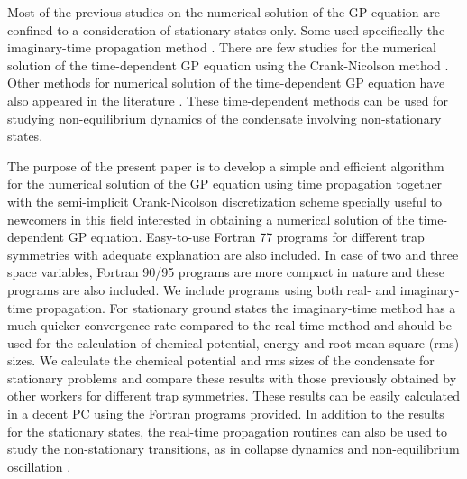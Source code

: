 \documentclass[onecolumn]{elsart3p}
\begin{document}
Most of the previous studies
\cite{Tiwari_Shukla,Bao_Tang,Schneider_Feder,chang,num1,num4,num10,num12,num13,num16,num17,num25,num26,num27,num31,xyz1,burnett}
on the numerical solution of the GP equation are confined to a consideration of
stationary states only. Some used specifically the imaginary-time propagation
method \cite{chio1,num23,aq,xyz1}. There are few studies
\cite{num22,num29,num30,num33} for the numerical solution of the time-dependent
GP equation using  the Crank-Nicolson method \cite{koonin,ames,dtray}. Other
methods for numerical solution of the time-dependent GP equation have also
appeared in the literature
\cite{chio2,num6,num8,num15,num18,num19,num20,num21,num24,num34,num35,holland,baer}.
These time-dependent methods can be used for studying non-equilibrium dynamics
of the condensate involving non-stationary states.


The purpose of the present paper is to develop {a simple and
efficient} algorithm for the numerical solution of the GP equation using  time
propagation together with the semi-implicit Crank-Nicolson discretization
scheme \cite{koonin,ames,dtray} specially useful to newcomers in this field
interested in obtaining a numerical solution of the time-dependent GP equation.
Easy-to-use Fortran 77  programs for different  trap symmetries with adequate
explanation are also included. In case of two and three space variables, Fortran
90/95 programs are more compact in nature and these programs are also included.
We include programs using both real- and imaginary-time propagation. For
stationary ground states the imaginary-time method has a much quicker 
convergence rate
compared to the real-time method and should be used for the calculation of
chemical potential, energy  and root-mean-square (rms) sizes. We calculate the chemical
potential and rms sizes of the condensate for stationary problems and compare
these results with those previously obtained by other workers for different trap
symmetries. These results can be easily calculated in a decent PC using the
Fortran programs provided. In addition to the results for the stationary states,
the real-time propagation routines can also be used to study the 
non-stationary
transitions,  as in  collapse dynamics \cite{ska5} and non-equilibrium
oscillation \cite{num22}.
\end{document}
